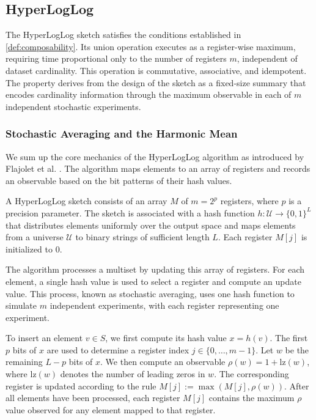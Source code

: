 \subsection{HyperLogLog} \label{subsec:hyperloglog}

The HyperLogLog sketch satisfies the conditions  established in \ref{def:composability}. Its union operation executes as a register-wise maximum, requiring time proportional only to the number of registers $m$, independent of dataset cardinality. This operation is commutative, associative, and idempotent. The property derives from the design of the sketch as a fixed-size summary that encodes cardinality information through the maximum observable in each of $m$ independent stochastic experiments.

\subsubsection{Stochastic Averaging and the Harmonic Mean}

We sum up the core mechanics of the HyperLogLog algorithm as introduced by Flajolet et al. \cite{Flajolet2007HyperLogLogTA}. The algorithm maps elements to an array of registers and records an observable based on the bit patterns of their hash values.

\begin{definition} \label{def:hll-sketch}
    A HyperLogLog sketch consists of an array $M$ of $m=2^p$ registers, where $p$ is a precision parameter. The sketch is associated with a hash function $h: \mathcal{U} \to \{0,1\}^L$ that distributes elements uniformly over the output space and maps elements from a universe $\mathcal{U}$ to binary strings of sufficient length $L$. Each register $M[j]$ is initialized to 0.
\end{definition}

The algorithm processes a multiset by updating this array of registers. For each element, a single hash value is used to select a register and compute an update value. This process, known as stochastic averaging, uses one hash function to simulate $m$ independent experiments, with each register representing one experiment.

To insert an element $v \in S$, we first compute its hash value $x = h(v)$. The first $p$ bits of $x$ are used to determine a register index $j \in \{0, \dots, m-1\}$. Let $w$ be the remaining $L-p$ bits of $x$. We then compute an observable $\rho(w) = 1 + \text{lz}(w)$, where $\text{lz}(w)$ denotes the number of leading zeros in $w$. The corresponding register is updated according to the rule $M[j] := \max(M[j], \rho(w))$. After all elements have been processed, each register $M[j]$ contains the maximum $\rho$ value observed for any element mapped to that register.

